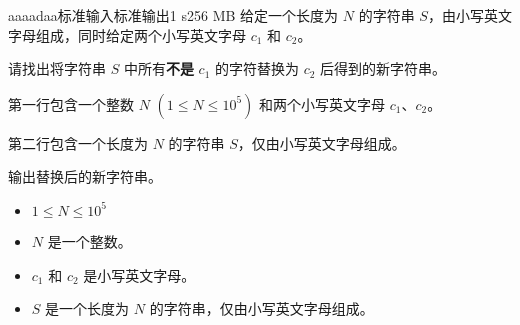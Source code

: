 \begin{problem}{aaaadaa}{标准输入}{标准输出}{1 s}{256 MB}
给定一个长度为 $N$ 的字符串 $S$，由小写英文字母组成，同时给定两个小写英文字母 $c_1$ 和 $c_2$。

请找出将字符串 $S$ 中所有\textbf{不是} $c_1$ 的字符替换为 $c_2$ 后得到的新字符串。

\InputFile
第一行包含一个整数 $N$ $(1 \leq N \leq 10^5)$ 和两个小写英文字母 $c_1$、$c_2$。

第二行包含一个长度为 $N$ 的字符串 $S$，仅由小写英文字母组成。

\OutputFile
输出替换后的新字符串。

\Example

\begin{example}
\end{example}

\Constraints
\begin{itemize}
\item $1 \leq N \leq 10^5$
\item $N$ 是一个整数。
\item $c_1$ 和 $c_2$ 是小写英文字母。
\item $S$ 是一个长度为 $N$ 的字符串，仅由小写英文字母组成。
\end{itemize}
\end{problem}
